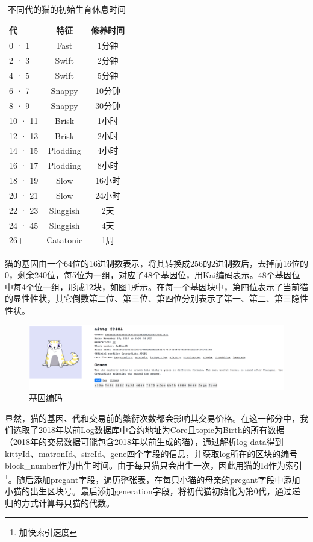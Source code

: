 \documentclass{myreport}
\begin{document}
\begin{table}[tb]
	\caption{不同代的猫的初始生育休息时间}
	\label{tab:generation}
	\centering

	\begin{tabular}{l|cc}
	\hline

	\hline
	\textbf{代} & \textbf{特征} & \textbf{修养时间} \\
	\hline
	0 · 1&	Fast&	1分钟\\
		\hline
	2 · 3&	Swift&	2分钟\\
		\hline
	4 · 5&	Swift&	5分钟\\
		\hline
	6 · 7&	Snappy&	10分钟\\
		\hline
	8 · 9&	Snappy&	30分钟\\
		\hline
	10 · 11&	Brisk&	1小时\\
		\hline
	12 · 13&	Brisk&	2小时\\
		\hline
	14 · 15&	Plodding&	4小时\\
		\hline
	16 · 17&	Plodding&	8小时\\
		\hline
	18 · 19&	Slow&	16小时\\
		\hline
	20 · 21&	Slow&	24小时\\
		\hline
	22 · 23&	Sluggish&	2天\\
		\hline
	24 · 45&	Sluggish&	4天\\
		\hline
	26+&	Catatonic&	1周\\

	\hline
	\end{tabular}
\end{table}


猫的基因由一个64位的16进制数表示，将其转换成256的2进制数后，去掉前16位的0，剩余240位，每5位为一组，对应了48个基因位，用Kai编码表示。48个基因位中每4个位一组，形成12块，如图\ref{fig:gene}所示。在每一个基因块中，第四位表示了当前猫的显性性状，其它倒数第二位、第三位、第四位分别表示了第一、第二、第三隐性性状。

\begin{figure}[!htbp]
	\centering
	\includegraphics[width=\linewidth]{figure/gene.png}
	\caption{基因编码}
	\label{fig:gene}
\end{figure}

显然，猫的基因、代和交易前的繁衍次数都会影响其交易价格。在这一部分中，我们选取了2018年以前Log数据库中合约地址为Core且topic为Birth的所有数据（2018年的交易数据可能包含2018年以前生成的猫），通过解析log data得到kittyId、matronId、sireId、gene四个字段的信息，并获取log所在的区块的编号block\_number作为出生时间。由于每只猫只会出生一次，因此用猫的Id作为索引\footnote{加快索引速度}。随后添加pregant字段，遍历整张表，在每只小猫的母亲的pregant字段中添加小猫的出生区块号。最后添加generation字段，将初代猫初始化为第0代，通过递归的方式计算每只猫的代数。
\end{document}
